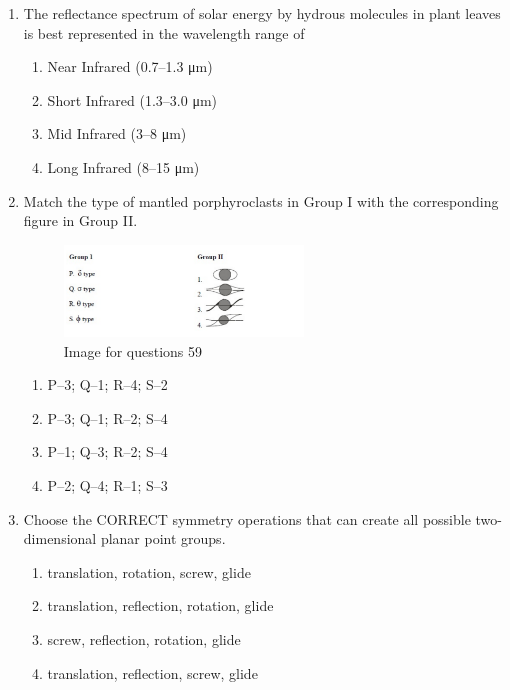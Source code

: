 \documentclass[journal,12pt,onecolumn]{IEEEtran}
\theoremstyle{remark}
\begin{document}
\begin{enumerate}
\begin{multicols}{2}
\begin{enumerate}
\item P--2; Q--1; R--5; S--3  
\item P--2; Q--1; R--4; S--3  
\item P--3; Q--4; R--1; S--5  
\item P--1; Q--3; R--1; S--5  
\end{enumerate}
\end{multicols}

\item The reflectance spectrum of solar energy by hydrous molecules in plant leaves is best represented in the wavelength range of  
\begin{enumerate}
\item Near Infrared (0.7--1.3 μm)  
\item Short Infrared (1.3--3.0 μm)  
\item Mid Infrared (3--8 μm)  
\item Long Infrared (8--15 μm)  
\end{enumerate}


\item Match the type of mantled porphyroclasts in Group I with the corresponding figure in Group II.

\begin{figure}[H]
    \centering
    \includegraphics[width=0.6\textwidth]{figs/fig13.png}
    \caption{Image for questions 59}
    \label{fig:question59}
\end{figure}




\begin{multicols}{2}
\begin{enumerate}
\item P--3; Q--1; R--4; S--2  
\item P--3; Q--1; R--2; S--4  
\item P--1; Q--3; R--2; S--4  
\item P--2; Q--4; R--1; S--3  
\end{enumerate}
\end{multicols}


\item Choose the CORRECT symmetry operations that can create all possible two-dimensional planar point groups.  
\begin{enumerate}
\item translation, rotation, screw, glide  
\item translation, reflection, rotation, glide  
\item screw, reflection, rotation, glide  
\item translation, reflection, screw, glide  
\end{enumerate}


\end{enumerate}
\end{document}
